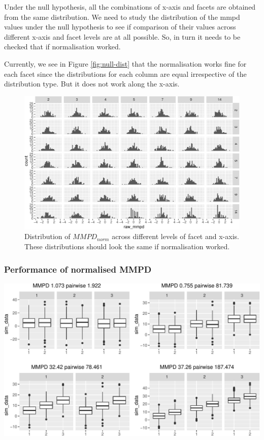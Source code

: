 \documentclass[
]{article}
\begin{document}
Under the null hypothesis, all the combinations of x-axis and facets are obtained from the same distribution. We need to study the distribution of the mmpd values under the null hypothesis to see if comparison of their values across different x-axis and facet levels are at all possible. So, in turn it needs to be checked that if normalisation worked.

Currently, we see in Figure \ref{fig:null-dist} that the normalisation works fine for each facet since the distributions for each column are equal irrespective of the distribution type. But it does not work along the x-axis.

\begin{figure}

{\centering \includegraphics[width=\textwidth]{figure/norm-data-1} 

}

\caption{Distribution of $MMPD_{norm}$ across different levels of facet and x-axis. These distributions should look the same if normalisation worked.}\label{fig:norm-data}
\end{figure}

\hypertarget{performance-of-normalised-mmpd}{%
\subsubsection{Performance of normalised MMPD}\label{performance-of-normalised-mmpd}}

\begin{center}\includegraphics[width=\textwidth]{figure/unnamed-chunk-4-1} \end{center}
\end{document}

